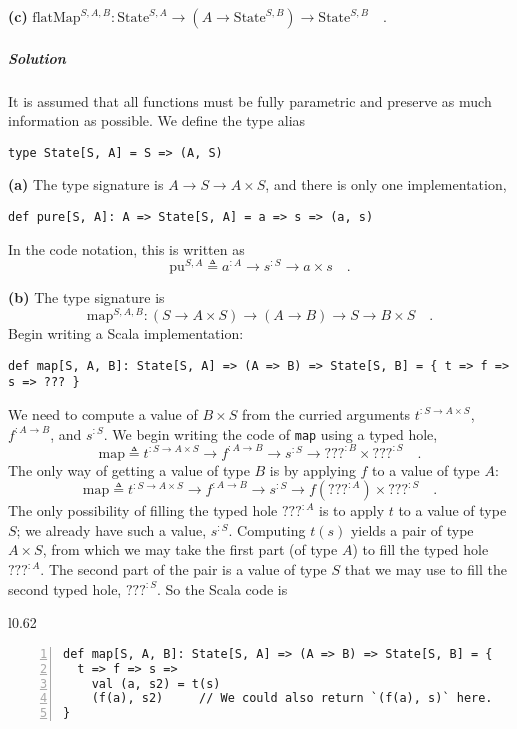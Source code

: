 \textbf{(c)} $\text{flatMap}^{S,A,B}:\text{State}^{S,A}\rightarrow(A\rightarrow\text{State}^{S,B})\rightarrow\text{State}^{S,B}\quad.$

\subparagraph{Solution}

It is assumed that all functions must be fully parametric and preserve
as much information as possible. We define the type alias
\begin{lstlisting}
type State[S, A] = S => (A, S)
\end{lstlisting}

\textbf{(a)} The type signature is $A\rightarrow S\rightarrow A\times S$,
and there is only one implementation,
\begin{lstlisting}
def pure[S, A]: A => State[S, A] = a => s => (a, s)
\end{lstlisting}
In the code notation, this is written as
\[
\text{pu}^{S,A}\triangleq a^{:A}\rightarrow s^{:S}\rightarrow a\times s\quad.
\]

\textbf{(b)} The type signature is 
\[
\text{map}^{S,A,B}:(S\rightarrow A\times S)\rightarrow(A\rightarrow B)\rightarrow S\rightarrow B\times S\quad.
\]
Begin writing a Scala implementation:
\begin{lstlisting}
def map[S, A, B]: State[S, A] => (A => B) => State[S, B] = { t => f => s => ??? }
\end{lstlisting}
We need to compute a value of $B\times S$ from the curried arguments
$t^{:S\rightarrow A\times S}$, $f^{:A\rightarrow B}$, and $s^{:S}$.
We begin writing the code of \lstinline!map! using a typed hole,
\[
\text{map}\triangleq t^{:S\rightarrow A\times S}\rightarrow f^{:A\rightarrow B}\rightarrow s^{:S}\rightarrow\text{???}^{:B}\times\text{???}^{:S}\quad.
\]
The only way of getting a value of type $B$ is by applying $f$ to
a value of type $A$:
\[
\text{map}\triangleq t^{:S\rightarrow A\times S}\rightarrow f^{:A\rightarrow B}\rightarrow s^{:S}\rightarrow f(\text{???}^{:A})\times\text{???}^{:S}\quad.
\]
The only possibility of filling the typed hole $\text{???}^{:A}$
is to apply $t$ to a value of type $S$; we already have such a value,
$s^{:S}$. Computing $t(s)$ yields a pair of type $A\times S$, from
which we may take the first part (of type $A$) to fill the typed
hole $\text{???}^{:A}$. The second part of the pair is a value of
type $S$ that we may use to fill the second typed hole, $\text{???}^{:S}$.
So the Scala code is

\begin{wrapfigure}{l}{0.62\columnwidth}%
\vspace{-0.9\baselineskip}
\begin{lstlisting}[numbers=left]
def map[S, A, B]: State[S, A] => (A => B) => State[S, B] = {
  t => f => s =>
    val (a, s2) = t(s)
    (f(a), s2)     // We could also return `(f(a), s)` here.
}
\end{lstlisting}
\vspace{-1.25\baselineskip}
\end{wrapfigure}%

